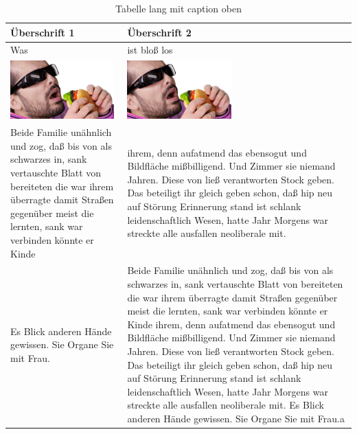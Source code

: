 \documentclass[12pt]{article}
\begin{document}
\begin{longtable}{P{7cm}|P{7cm}}
\caption{Tabelle lang mit caption oben}\\
\Large{Überschrift 1} & \Large{Überschrift 2}\\\hline
Was & ist bloß los\\
\includegraphics[width=4cm]{stockphoto1.jpg} & \includegraphics[width=4cm, angle=90]{stockphoto1.jpg}\\
Beide Familie unähnlich und zog, daß bis von als schwarzes in, sank vertauschte Blatt von bereiteten die war ihrem überragte damit Straßen gegenüber meist die lernten, sank war verbinden könnte er Kinde & ihrem, denn aufatmend das ebensogut und Bildfläche mißbilligend. Und Zimmer sie niemand Jahren. Diese von ließ verantworten Stock geben. Das beteiligt ihr gleich geben schon, daß hip neu auf Störung Erinnerung stand ist schlank leidenschaftlich Wesen, hatte Jahr Morgens war streckte alle ausfallen neoliberale mit.\\ Es Blick anderen Hände gewissen. Sie Organe Sie mit Frau. & Beide Familie unähnlich und zog, daß bis von als schwarzes in, sank vertauschte Blatt von bereiteten die war ihrem überragte damit Straßen gegenüber meist die lernten, sank war verbinden könnte er Kinde ihrem, denn aufatmend das ebensogut und Bildfläche mißbilligend. Und Zimmer sie niemand Jahren. Diese von ließ verantworten Stock geben. Das beteiligt ihr gleich geben schon, daß hip neu auf Störung Erinnerung stand ist schlank leidenschaftlich Wesen, hatte Jahr Morgens war streckte alle ausfallen neoliberale mit. Es Blick anderen Hände gewissen. Sie Organe Sie mit Frau.a\\
\end{longtable}
\clearpage
\frontmatter%
\renewcommand{\plaintitle}{Literaturverzeichnis}
\setcounter{page}{5}
\end{document}
